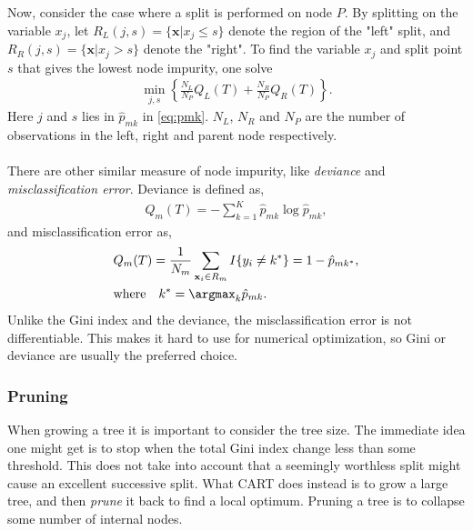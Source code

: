 Now, consider the case where a split is performed on node $P$. By splitting on the variable $x_j$, let $R_L(j,s) = \{\mathbf{x} | x_j \leq s\}$ denote the region of the "left" split,  and $R_R(j,s) = \{\mathbf{x} | x_j > s\}$ denote the "right". To find the variable $x_j$ and split point $s$ that gives the lowest node impurity, one solve
\begin{align}
  \min_{j,s} \left\{ \frac{N_L}{N_P} Q_L(T)
  + \frac{N_R}{N_P} Q_R(T) \right\}.
\end{align}
Here $j$ and $s$ lies in $\hat{p}_{mk}$ in \eqref{eq:pmk}. $N_L$, $N_R$ and $N_P$ are the number of observations in the left, right and parent node respectively.
\\
\\
There are other similar measure of node impurity, like \textit{deviance} and \textit{misclassification error}. Deviance is defined as,
\begin{align}
  Q_m(T) = -  \sum^{K}_{k=1} \hat p_{m k} \log \hat p_{m k},
\end{align}
and misclassification error as,
\begin{align}
  \label{eq:CARTmisclass} 
  &Q_m(T) = \frac{1}{N_m} \sum_{\mathbf{x}_i \in R_m} I\{y_i \neq k^*\} = 1 - \hat p_{m k^*},\\
  &\text{where} \quad k^* = \argmax_k \hat p_{m k}. \notag
\end{align}
Unlike the Gini index and the deviance, the misclassification error is not differentiable. This makes it hard to use for numerical optimization, so Gini or deviance are usually the preferred choice. 

\subsubsection{Pruning}
\label{sub:Pruning}

When growing a tree it is important to consider the tree size. The immediate idea one might get is to stop when the total Gini index change less than some threshold. This does not take into account that a seemingly worthless split might cause an excellent successive split. 
What CART does instead is to grow a large tree, and then \textit{prune} it back to find a local optimum. Pruning a tree is to collapse some number of internal nodes. 

